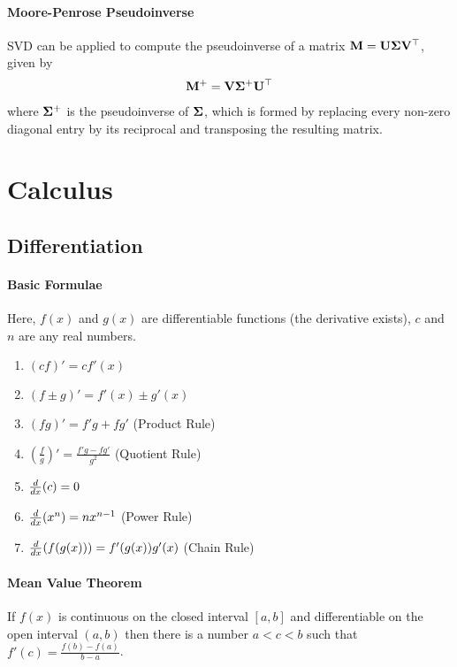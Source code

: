 \paragraph{Moore-Penrose Pseudoinverse}

SVD can be applied to compute the pseudoinverse of a matrix $\mathbf{M}=\mathbf{U}\mathbf{\Sigma}\mathbf{V}{}^\top$, given by
\begin{align*}
	\mathbf{M}^+=\mathbf{V}\mathbf{\Sigma}^+\mathbf{U}{}^\top
\end{align*}
where $\mathbf{\Sigma}^+$ is the pseudoinverse of $\mathbf{\Sigma}$, which is formed by replacing every non-zero diagonal entry by its reciprocal and transposing the resulting matrix.



\section{Calculus}
\label{section2.3}

\subsection{Differentiation}

\paragraph{Basic Formulae}

Here, $f(x)$ and $g(x)$ are differentiable functions (the derivative exists), $c$ and $n$ are any real numbers.
\begin{enumerate}
	\item $(cf)'=cf'(x)$
	\item $(f\pm g)'=f'(x)\pm g'(x)$
	\item $(fg)'=f'g+fg'$ (Product Rule)
	\item $(\frac{f}{g})'=\frac{f'g-fg'}{g^2}$ (Quotient Rule)
	\item $\frac{d}{dx}(c)=0$
	\item $\frac{d}{dx}(x^n)=nx^{n-1}$ (Power Rule)
	\item $\frac{d}{dx}(f(g(x)))=f'(g(x))g'(x)$ (Chain Rule)
\end{enumerate}

\paragraph{Mean Value Theorem}

If $f(x)$ is continuous on the closed interval $[a,b]$ and differentiable on the open interval $(a,b)$ then there is a number $a<c<b$ such that $f'(c)=\frac{f(b)-f(a)}{b-a}$.

